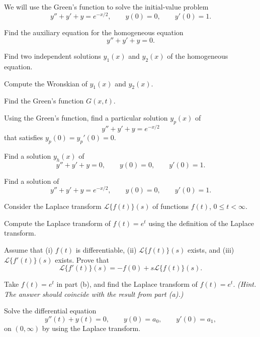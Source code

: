 \documentclass[11pt,oneside]{article}
\begin{document}
\begin{problem}
We will use the Green's function to solve the initial-value problem
\[
y''+y'+y=e^{-x/2},
\qquad
y(0)=0,
\qquad
y'(0)=1.
\]
\begin{problemsubparts}
\item Find the auxiliary equation for the homogeneous equation
\[
y''+y'+y=0.
\]
\item Find two independent solutions $y_1(x)$ and $y_2(x)$ of the homogeneous equation.
\item Compute the Wronskian of $y_1(x)$ and $y_2(x)$.
\item Find the Green's function $G(x,t)$.
\item Using the Green's function, find a particular solution $y_p(x)$ of
\[
y''+y'+y=e^{-x/2}
\]
that satisfies $y_p(0)=y_p'(0)=0$.
\item Find a solution $y_h(x)$ of
\[
y''+y'+y=0,
\qquad
y(0)=0,
\qquad
y'(0)=1.
\]
\item Find a solution of
\[
y''+y'+y=e^{-x/2},
\qquad
y(0)=0,
\qquad
y'(0)=1.
\]
\end{problemsubparts}
\end{problem}

\begin{problem}
Consider the Laplace transform $\mathcal{L}\{f(t)\}(s)$ of functions $f(t)$, $0\le t<\infty$.
\begin{problemsubparts}
\item Compute the Laplace transform of $f(t)=e^t$ using the definition of the Laplace transform.
\item Assume that (i) $f(t)$ is differentiable, (ii) $\mathcal{L}\{f(t)\}(s)$ exists, and (iii) $\mathcal{L}\{f'(t)\}(s)$ exists. Prove that
\[
\mathcal{L}\{f'(t)\}(s)=-f(0)+s\mathcal{L}\{f(t)\}(s).
\]
\item Take $f(t)=e^t$ in part (b), and find the Laplace transform of $f(t)=e^t$. \textit{(Hint. The answer should coincide with the result from part (a).)}
\item Solve the differential equation
\[
y''(t)+y(t)=0,
\qquad
y(0)=a_0,
\qquad
y'(0)=a_1,
\]
on $(0,\infty)$ by using the Laplace transform.
\end{problemsubparts}
\end{problem}
\end{document}
